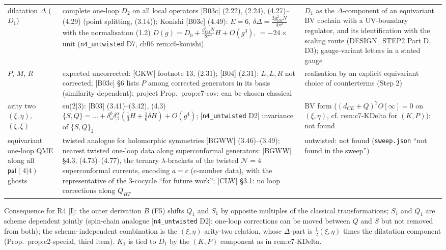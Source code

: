 \documentclass[11pt]{article}
\theoremstyle{definition}
\newcommand{\Il}{\textup{[I]}}
\begin{document}
\begin{longtable}{p{2.6cm}p{6.6cm}p{6.6cm}}
dilatation $\Delta$ ($D_1$) & complete one-loop $D_2$ on all local operators [B03c] (2.22), (2.24), (4.27)--(4.29) (point splitting, (3.14)); Konishi [B03c] (4.49): $E=6$, $\delta\Delta=\frac{3g_{YM}^2N}{4\pi^2}$ with the normalisation (1.2) $D(g)=D_0+\frac{g_{YM}^2N}{8\pi^2}H+O(g^3)$, $=-24\times$unit (\texttt{n4\_untwisted} D7, ch06 rem:c6-konishi) & $D_1$ as the $\Delta$-component of an equivariant BV cochain with a UV-boundary regulator, and its identification with the scaling route (DESIGN\_STEP2 Part D, D3); gauge-variant letters in a stated gauge\\
$P$, $M$, $R$ & expected uncorrected: [GKW] footnote 13, (2.31); [B04] (2.31): $L,\dot L,R$ not corrected; [B03c] \S6 lists $P$ among corrected generators in its basis (similarity dependent); project Prop.~prop:c7-cov: can be chosen classical & realisation by an explicit equivariant choice of counterterms (Step 2)\\
arity two $(\xi,\eta)$, $(\xi,\xi)$ & su(2$|$3): [B03] (3.41)--(3.42), (4.3) $\{S,Q\}=\dots+\delta^b_a\delta^\alpha_\beta(\frac13H+\frac16\delta H)+O(g^4)$; [\texttt{n4\_untwisted} D2] invariance of $\{S,Q\}_2$ & BV form ($(d_{CE}+Q)^2O[\infty]=0$ on $(\xi,\eta)$, cf. rem:c7-KDelta for $(K,P)$): not found\\
equivariant one-loop QME along all $\mathfrak{psl}(4|4)$ ghosts & twisted analogue for holomorphic symmetries [BGWW] (3.46)--(3.49); nearest twisted one-loop data along superconformal generators: [BGWW] \S4.3, (4.73)--(4.77), the ternary $\lambda$-brackets of the twisted $\mathcal N=4$ superconformal currents, encoding $a=c$ (c-number data), with the representative of the 3-cocycle ``for future work''; [CLW] \S3.1: no loop corrections along $Q_{HT}$ & untwisted: not found (\texttt{sweep.json} ``not found in the sweep'')\\
\bottomrule
\end{longtable}

Consequence for R4 \Il: the outer derivation $B$ (F5) shifts $Q_1$ and $S_1$ by opposite multiples of the classical transformations; $S_1$ and $Q_1$ are scheme dependent jointly (spin-chain analogue [\texttt{n4\_untwisted} D2]: one-loop corrections can be moved between $Q$ and $S$ but not removed from both); the scheme-independent combination is the $(\xi,\eta)$ arity-two relation, whose $\Delta$-part is $\tfrac12(\xi,\eta)$ times the dilatation component (Prop.~prop:c2-special, third item). $K_1$ is tied to $D_1$ by the $(K,P)$ component as in rem:c7-KDelta.
\end{document}
